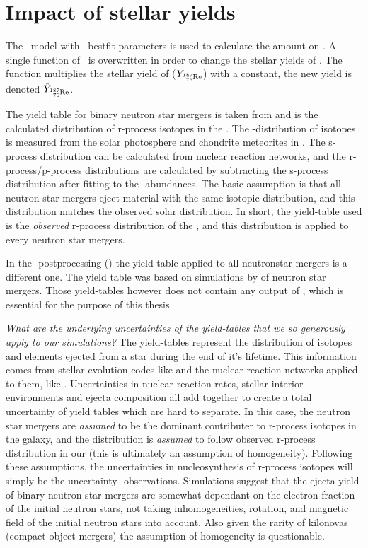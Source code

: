 \FloatBarrier

\section{Impact of stellar yields} \label{sec:methods-yields}
The \omegamodel\ model with \eris\ bestfit parameters is used to calculate the amount on .
A single function of \omegamodel\ is overwritten in order to change the stellar yields of .
The function multiplies the stellar yield of  ($Y_\re{187}$) with a constant, the new yield is denoted $\hat{Y}_\re{187}$.

The yield table for binary neutron star mergers is taken from \cite{arnould07} and is the calculated distribution of r-process isotopes in the \sos.
The \sos-distribution of isotopes is measured from the solar photosphere and chondrite meteorites in \cite{landolt93}.
The s-process distribution can be calculated from nuclear reaction networks, and the r-process/p-process distributions are calculated by subtracting the s-process distribution after fitting to the \sos-abundances.
The basic assumption is that all neutron star mergers eject material with the same isotopic distribution, and this distribution matches the observed solar distribution.
In short, the yield-table used is the \textit{observed} r-process distribution of the \sos, and this distribution is applied to every neutron star mergers.

In the \eris-postprocessing () the yield-table applied to all neutronstar mergers is a different one.
The yield table was based on simulations by  of neutron star mergers. Those yield-tables however does not contain any output of , which is essential for the purpose of this thesis.

\textit{What are the underlying uncertainties of the yield-tables that we so generously apply to our simulations?}
The yield-tables represent the distribution of isotopes and elements ejected from a star during the end of it's lifetime. This information comes from stellar evolution codes like \cite{paxton11} and the nuclear reaction networks applied to them, like \cite{pignatari16}.
Uncertainties in nuclear reaction rates, stellar interior environments and ejecta composition all add together to create a total uncertainty of yield tables which are hard to separate.
In this case, the neutron star mergers are \textit{assumed} to be the dominant contributer to r-process isotopes in the galaxy, and the distribution is \textit{assumed} to follow observed r-process distribution in our \sos (this is ultimately an assumption of homogeneity).
Following these assumptions, the uncertainties in nucleosynthesis of r-process isotopes will simply be the uncertainty \sos-observations\cite{arnould07}.
Simulations suggest that the ejecta yield of binary neutron star mergers are somewhat dependant on the electron-fraction of the initial neutron stars, not taking inhomogeneities, rotation, and magnetic field of the initial neutron stars into account. Also given the rarity of kilonovas (compact object mergers) the assumption of homogeneity is questionable.

